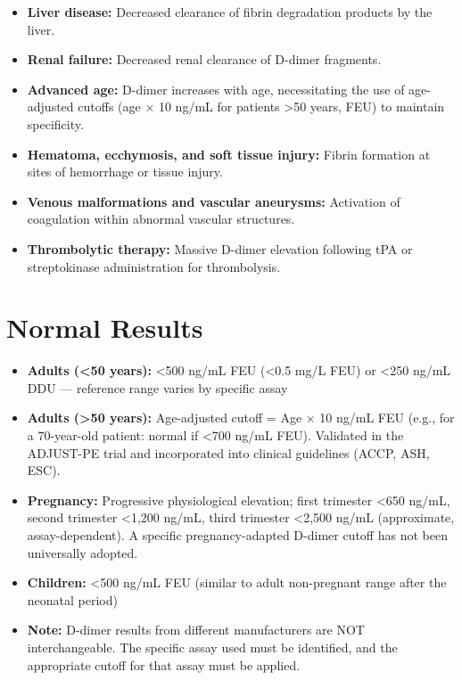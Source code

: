 \begin{itemize}
  \item \textbf{Liver disease:} Decreased clearance of fibrin degradation products by the liver.
  \item \textbf{Renal failure:} Decreased renal clearance of D-dimer fragments.
  \item \textbf{Advanced age:} D-dimer increases with age, necessitating the use of age-adjusted cutoffs (age $\times$ 10 ng/mL for patients >50 years, FEU) to maintain specificity.
  \item \textbf{Hematoma, ecchymosis, and soft tissue injury:} Fibrin formation at sites of hemorrhage or tissue injury.
  \item \textbf{Venous malformations and vascular aneurysms:} Activation of coagulation within abnormal vascular structures.
  \item \textbf{Thrombolytic therapy:} Massive D-dimer elevation following tPA or streptokinase administration for thrombolysis.
\end{itemize}

\section*{Normal Results}
\begin{itemize}
  \item \textbf{Adults (<50 years):} <500 ng/mL FEU (<0.5 mg/L FEU) or <250 ng/mL DDU --- reference range varies by specific assay
  \item \textbf{Adults (>50 years):} Age-adjusted cutoff = Age $\times$ 10 ng/mL FEU (e.g., for a 70-year-old patient: normal if <700 ng/mL FEU). Validated in the ADJUST-PE trial and incorporated into clinical guidelines (ACCP, ASH, ESC).
  \item \textbf{Pregnancy:} Progressive physiological elevation; first trimester <650 ng/mL, second trimester <1,200 ng/mL, third trimester <2,500 ng/mL (approximate, assay-dependent). A specific pregnancy-adapted D-dimer cutoff has not been universally adopted.
  \item \textbf{Children:} <500 ng/mL FEU (similar to adult non-pregnant range after the neonatal period)
  \item \textbf{Note:} D-dimer results from different manufacturers are NOT interchangeable. The specific assay used must be identified, and the appropriate cutoff for that assay must be applied.
\end{itemize}

